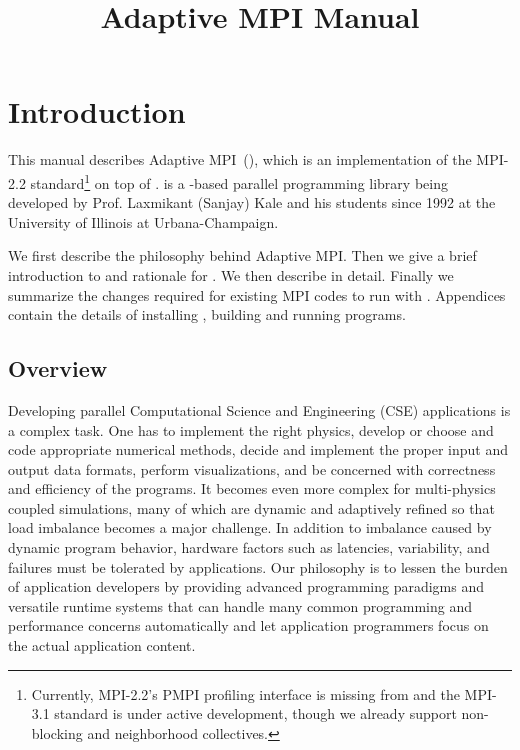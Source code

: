 \documentclass[10pt]{article}
\title{Adaptive MPI Manual}
\begin{document}
\maketitle

\section{Introduction}

This manual describes Adaptive MPI~(\ampi{}), which is an implementation of the
MPI-2.2 standard\footnote{Currently, MPI-2.2's PMPI profiling interface is missing
from \ampi{} and the MPI-3.1 standard is under active development, though we already
support non-blocking and neighborhood collectives.} on top of \charmpp{}. \charmpp{} is a
\CC{}-based parallel programming library being developed by Prof.
Laxmikant (Sanjay) Kale and his students since 1992 at the University of
Illinois at Urbana-Champaign.

We first describe the philosophy behind Adaptive MPI. Then we give a brief
introduction to \charmpp{} and rationale for \ampi{}. We then describe
\ampi{} in detail. Finally we summarize the changes required for existing MPI
codes to run with \ampi{}. Appendices contain the details of installing
\ampi{}, building and running \ampi{} programs.

\subsection{Overview}

Developing parallel Computational Science and Engineering (CSE) applications is
a complex task. One has to implement the right physics, develop or choose and
code appropriate numerical methods, decide and implement the proper input and
output data formats, perform visualizations, and be concerned with correctness
and efficiency of the programs. It becomes even more complex for multi-physics
coupled simulations, many of which are dynamic and adaptively refined 
so that load imbalance becomes a major challenge. In addition to imbalance
caused by dynamic program behavior, hardware factors such as latencies,
variability, and failures must be tolerated by applications.
Our philosophy is to lessen the burden of application developers by
providing advanced programming paradigms and versatile runtime systems that can
handle many common programming and performance concerns automatically and let
application programmers focus on the actual application content.
\end{document}
